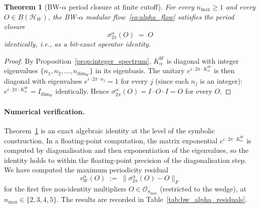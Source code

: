 \documentclass[11pt,a4paper]{article}
\theoremstyle{plain}
\newtheorem{theorem}{Theorem}[section]
\theoremstyle{definition}
\newcommand{\nmax}{n_{\max}}
\newcommand{\Hilb}{\mathcal{H}}
\newcommand{\Op}{\mathcal{O}}
\newcommand{\Frob}[1]{\lVert #1 \rVert_{F}}
\begin{document}
\begin{theorem}[BW-$\alpha$ period closure at finite cutoff]
\label{thm:bw_alpha}
For every $\nmax \ge 1$ and every $O \in B(\Hilb_W)$, the BW-$\alpha$
modular flow~\eqref{eq:alpha_flow} satisfies the period closure
\begin{equation}\label{eq:bw_alpha_closure}
   \sigma_{2\pi}^{\alpha}(O) \;=\; O
\end{equation}
identically, i.e., as a bit-exact operator identity.
\end{theorem}

\begin{proof}
By Proposition~\ref{prop:integer_spectrum}, $K_\alpha^W$ is diagonal
with integer eigenvalues $\{n_1, n_2, \ldots, n_{\dim_W}\}$ in its
eigenbasis. The unitary $e^{i \cdot 2\pi \cdot K_\alpha^W}$ is then
diagonal with eigenvalues $e^{i \cdot 2\pi \cdot n_j} = 1$ for every
$j$ (since each $n_j$ is an integer):\
$e^{i \cdot 2\pi \cdot K_\alpha^W} = I_{\dim_W}$ identically. Hence
$\sigma_{2\pi}^{\alpha}(O) = I \cdot O \cdot I = O$ for every $O$.
\end{proof}

\paragraph{Numerical verification.}
Theorem~\ref{thm:bw_alpha} is an exact algebraic identity at the level
of the symbolic construction. In a floating-point computation, the
matrix exponential $e^{i \cdot 2\pi \cdot K_\alpha^W}$ is computed by
diagonalisation and then exponentiation of the eigenvalues, so the
identity holds to within the floating-point precision of the
diagonalisation step. We have computed the maximum periodicity
residual
\begin{equation}\label{eq:periodicity_residual_def}
   r_W^{\alpha}(O) \;:=\; \Frob{\sigma_{2\pi}^{\alpha}(O) - O}
\end{equation}
for the first five non-identity multipliers $O \in \Op_{\nmax}$
(restricted to the wedge), at $\nmax \in \{2, 3, 4, 5\}$. The
results are recorded in Table~\ref{tab:bw_alpha_residuals}.
\end{document}
